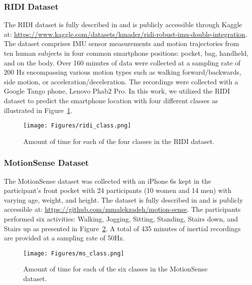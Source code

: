 \documentclass[journal]{IEEEtran}
\begin{document}
\subsubsection{RIDI Dataset} \label{ridi}
\noindent The RIDI dataset is fully described in \cite{yan2018ridi} and is publicly accessible through Kaggle at: \url {https://www.kaggle.com/datasets/kmader/ridi-robust-imu-double-integration}. 
The dataset comprises IMU sensor measurements and motion trajectories from ten human subjects in four common smartphone positions: pocket,  bag,  handheld, and on the body. 
Over 160 minutes of data were collected at a sampling rate of 200 Hz encompassing various motion types such as walking forward/backwards, side motion, or acceleration/deceleration. The recordings were collected with a Google Tango phone, Lenovo Phab2 Pro.
In this work, we utilized the RIDI dataset to predict the smartphone location with four different classes as illustrated in Figure~\ref{fig:ridi_class}.
%
\begin{figure}[h]
    \centering
    \texttt{[image: Figures/ridi\_class.png]}
    \caption{Amount of time for each of the four classes in the RIDI dataset.}
    \label{fig:ridi_class}
\end{figure}
%
%
\subsubsection{MotionSense Dataset} \label{MS}
The MotionSense dataset was collected with an iPhone 6s kept in the participant's front pocket with 24 participants (10 women and 14 men) with varying age, weight, and height. The  dataset is fully described in \cite{malekzadeh2019mobile} and is publicly accessible at: \url {https://github.com/mmalekzadeh/motion-sense}. 
The participants performed six activities:  Walking, Jogging, Sitting, Standing, Stairs down, and Stairs up as presented in Figure~\ref{fig:ms_class}. A total of 435 minutes of inertial recordings are provided at a sampling rate of 50Hz.
%
\begin{figure}[h]
    \centering
    \texttt{[image: Figures/ms\_class.png]}
    \caption{Amount of time for each of the six classes in the MotionSense dataset.}
    \label{fig:ms_class}
\end{figure}
%
%
\end{document}
